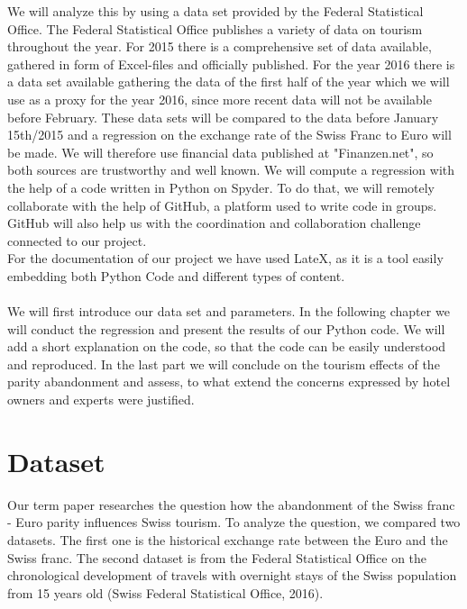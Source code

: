 \documentclass[12pt,a4paper,bibliography=totocnumbered,listof=totocnumbered]{scrartcl}
\begin{document}
We will analyze this by using a data set provided by the Federal Statistical Office. The Federal Statistical Office publishes a variety of data on tourism throughout the year. For 2015 there is a comprehensive set of data available, gathered in form of Excel-files and officially published. For the year 2016 there is a data set available gathering the data of the first half of the year which we will use as a proxy for the year 2016, since more recent data will not be available before February. These data sets will be compared to the data before January 15th/2015 and a regression on the exchange rate of the Swiss Franc to Euro will be made. We will therefore use financial data published at "Finanzen.net", so both sources are trustworthy and well known. We will compute a regression with the help of a code written in Python on Spyder. To do that, we will remotely collaborate with the help of GitHub, a platform used to write code in groups. GitHub will also help us with the coordination and collaboration challenge connected to our project.\\
For the documentation of our project we have used LateX, as it is a tool easily embedding both Python Code and different types of content. \\
\\
We will first introduce our data set and parameters. In the following chapter we will conduct the regression and present the results of our Python code. We will add a short explanation on the code, so that the code can be easily understood and reproduced. In the last part we will conclude on the tourism effects of the parity abandonment and assess, to what extend the concerns expressed by hotel owners and experts were justified. 


\newpage


% 
\section{Dataset}



Our term paper researches the question how the abandonment of the Swiss franc - Euro parity influences Swiss tourism. To analyze the question, we compared two datasets. The first one is the historical exchange rate between the Euro and the Swiss franc. The second dataset is from the Federal Statistical Office on the chronological development of travels with overnight stays of the Swiss population from 15 years old (Swiss Federal Statistical Office, 2016). 
\end{document}
